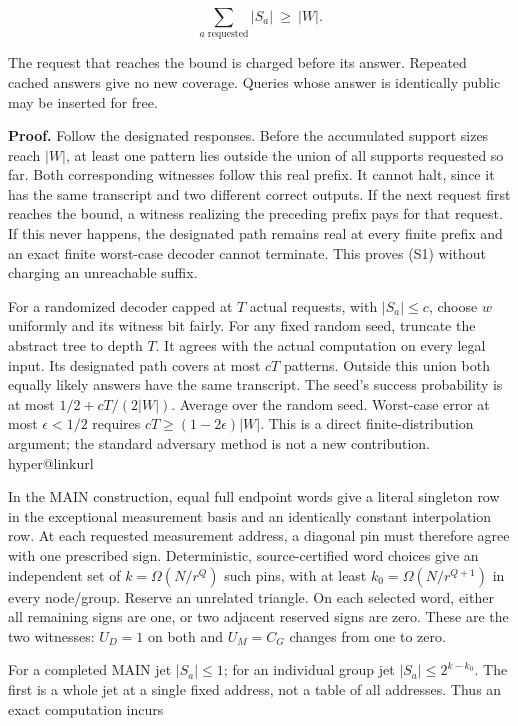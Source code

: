 \documentclass[
  11pt,
]{article}
\makeatletter
\newcommand{\PaperSixCatalogue}[1]{\csname hyper@linkurl\endcsname{#1}{EVIDENCE_CATALOG.md}}
\newcommand{\PaperSixEvidence}[2]{\PaperSixCatalogue{#2}}
\makeatother
\begin{document}
\[
                  \sum_{a\text{ requested}}|S_a|\ \ge\ |W|.       \tag{S1}
\]

The request that reaches the bound is charged before its answer.
Repeated cached answers give no new coverage. Queries whose answer is
identically public may be inserted for free.

\textbf{Proof.} Follow the designated responses. Before the accumulated
support sizes reach \(|W|\), at least one pattern lies outside the union
of all supports requested so far. Both corresponding witnesses follow
this real prefix. It cannot halt, since it has the same transcript and
two different correct outputs. If the next request first reaches the
bound, a witness realizing the preceding prefix pays for that request.
If this never happens, the designated path remains real at every finite
prefix and an exact finite worst-case decoder cannot terminate. This
proves (S1) without charging an unreachable suffix.

For a randomized decoder capped at \(T\) actual requests, with
\(|S_a|\le c\), choose \(w\) uniformly and its witness bit fairly. For
any fixed random seed, truncate the abstract tree to depth \(T\). It
agrees with the actual computation on every legal input. Its designated
path covers at most \(cT\) patterns. Outside this union both equally
likely answers have the same transcript. The seed's success probability
is at most \(1/2+cT/(2|W|)\). Average over the random seed. Worst-case
error at most \(\epsilon<1/2\) requires \(cT\ge(1-2\epsilon)|W|\). This
is a direct finite-distribution argument; the standard adversary method
is not a new contribution.
\PaperSixEvidence{evidence/research_v9/formal/DiagonalQueryTree.lean}{Actual-tree Lean proof}

In the MAIN construction, equal full endpoint words give a literal
singleton row in the exceptional measurement basis and an identically
constant interpolation row. At each requested measurement address, a
diagonal pin must therefore agree with one prescribed sign.
Deterministic, source-certified word choices give an independent set of
\(k=\Omega(N/r^Q)\) such pins, with at least \(k_0=\Omega(N/r^{Q+1})\)
in every node/group. Reserve an unrelated triangle. On each selected
word, either all remaining signs are one, or two adjacent reserved signs
are zero. These are the two witnesses: \(U_D=1\) on both and \(U_M=C_G\)
changes from one to zero.

For a completed MAIN jet \(|S_a|\le1\); for an individual group jet
\(|S_a|\le2^{k-k_0}\). The first is a whole jet at a single fixed
address, not a table of all addresses. Thus an exact computation incurs
\end{document}
